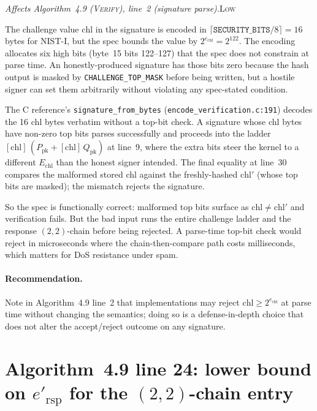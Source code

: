 \documentclass[a4paper,11pt]{article}
\newcommand{\algo}[1]{Algorithm~#1}
\newcommand{\low}{\textsc{\color{OliveGreen}Low}}
\newcommand{\finding}[2]{\noindent\textit{#1}\hfill#2\par\smallskip}
\begin{document}
\finding{Affects \algo{4.9} (\textsc{Verify}), line~2 (signature
parse).}{\low}

The challenge value $\mathrm{chl}$ in the signature is encoded
in $\lceil \texttt{SECURITY\_BITS} / 8 \rceil = 16$ bytes for
NIST-I, but the spec bounds the value by
$2^{e_{\mathrm{chl}}} = 2^{122}$.  The encoding allocates six
high bits (byte~15 bits 122--127) that the spec does not
constrain at parse time.  An honestly-produced signature has
those bits zero because the hash output is masked by
\texttt{CHALLENGE\_TOP\_MASK} before being written, but a
hostile signer can set them arbitrarily without violating any
spec-stated condition.

The C reference's \texttt{signature\_from\_bytes}
(\texttt{encode\_verification.c:191}) decodes the 16 chl bytes
verbatim without a top-bit check.  A signature whose chl bytes
have non-zero top bits parses successfully and proceeds into
the ladder
$[\mathrm{chl}]\,(P_{\mathrm{pk}} + [\mathrm{chl}]\,Q_{\mathrm{pk}})$
at line~9, where the extra bits steer the kernel to a different
$E_{\mathrm{chl}}$ than the honest signer intended.  The final
equality at line~30 compares the malformed stored chl against
the freshly-hashed $\mathrm{chl}'$ (whose top bits are masked);
the mismatch rejects the signature.

So the spec is functionally correct: malformed top bits surface
as $\mathrm{chl} \ne \mathrm{chl}'$ and verification fails.  But
the bad input runs the entire challenge ladder and the response
$(2,2)$-chain before being rejected.  A parse-time top-bit
check would reject in microseconds where the chain-then-compare
path costs milliseconds, which matters for DoS resistance under
spam.

\paragraph{Recommendation.}  Note in \algo{4.9} line~2 that
implementations may reject $\mathrm{chl} \ge 2^{e_{\mathrm{chl}}}$
at parse time without changing the semantics; doing so is a
defense-in-depth choice that does not alter the accept/reject
outcome on any signature.

\section{\algo{4.9} line 24: lower bound on $e'_{\mathrm{rsp}}$ for
  the $(2,2)$-chain entry}
\label{sec:spec-e-rsp-prime-lower-bound}
\end{document}
